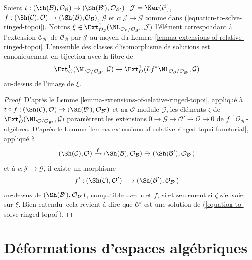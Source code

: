 \begin{lemma}
\label{lemma-parametrize-solutions-ringed-topoi}
Soient $t : (\Sh(\mathcal{B}), \mathcal{O}_\mathcal{B}) \to
(\Sh(\mathcal{B}'), \mathcal{O}_{\mathcal{B}'})$,
$\mathcal{J} = \Ker(t^\sharp)$,
$f : (\Sh(\mathcal{C}), \mathcal{O}) \to
(\Sh(\mathcal{B}), \mathcal{O}_\mathcal{B})$, $\mathcal{G}$ et
$c : \mathcal{J} \to \mathcal{G}$ comme dans
(\ref{equation-to-solve-ringed-topoi}).
Notons $\xi \in \Ext^1_{\mathcal{O}_\mathcal{B}}(
\NL_{\mathcal{O}_\mathcal{B}/\mathcal{O}_{\mathcal{B}'}}, \mathcal{J})$
l'élément correspondant à l'extension $\mathcal{O}_{\mathcal{B}'}$ de
$\mathcal{O}_\mathcal{B}$ par $\mathcal{J}$ au moyen du
Lemme \ref{lemma-extensions-of-relative-ringed-topoi}.
L'ensemble des classes d'isomorphisme de solutions est canoniquement en
bijection avec la fibre de
$$
\Ext^1_\mathcal{O}(\NL_{\mathcal{O}/\mathcal{O}_{\mathcal{B}'}},
\mathcal{G})\to
\Ext^1_\mathcal{O}(
Lf^*\NL_{\mathcal{O}_\mathcal{B}/\mathcal{O}_{\mathcal{B}'}}, \mathcal{G})
$$
au-dessus de l'image de $\xi$.
\end{lemma}

\begin{proof}
D'après le Lemme \ref{lemma-extensions-of-relative-ringed-topoi}, appliqué à
$t \circ f : (\Sh(\mathcal{C}), \mathcal{O}) \to
(\Sh(\mathcal{B}'), \mathcal{O}_{\mathcal{B}'})$ et au $\mathcal{O}$-module
$\mathcal{G}$, les éléments $\zeta$ de
$\Ext^1_\mathcal{O}(\NL_{\mathcal{O}/\mathcal{O}_{\mathcal{B}'}},
\mathcal{G})$ paramètrent les extensions
$0 \to \mathcal{G} \to \mathcal{O}' \to \mathcal{O} \to 0$ de
$f^{-1}\mathcal{O}_{\mathcal{B}'}$-algèbres. D'après le
Lemme \ref{lemma-extensions-of-relative-ringed-topoi-functorial}, appliqué à
$$
(\Sh(\mathcal{C}), \mathcal{O}) \xrightarrow{f}
(\Sh(\mathcal{B}), \mathcal{O}_\mathcal{B}) \xrightarrow{t}
(\Sh(\mathcal{B}'), \mathcal{O}_{\mathcal{B}'})
$$
et à $c : \mathcal{J} \to \mathcal{G}$, il existe un morphisme
$$
f' : 
(\Sh(\mathcal{C}), \mathcal{O}')
\longrightarrow
(\Sh(\mathcal{B}'), \mathcal{O}_{\mathcal{B}'})
$$
au-dessus de $(\Sh(\mathcal{B}'), \mathcal{O}_{\mathcal{B}'})$, compatible
avec $c$ et $f$, si et seulement si $\zeta$ s'envoie sur $\xi$.
Bien entendu, cela revient à dire que $\mathcal{O}'$ est une solution de
(\ref{equation-to-solve-ringed-topoi}).
\end{proof}

\section{Déformations d'espaces algébriques}
\label{section-deformations-spaces}

